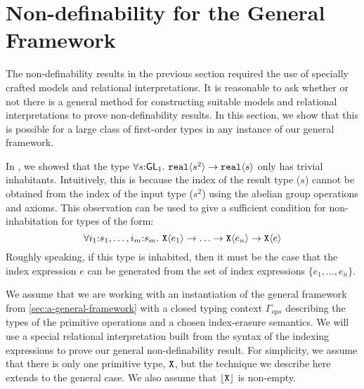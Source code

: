 \section{Non-definability for the General Framework}
\label{sec:general-nondef}

The non-definability results in the previous section required the use
of specially crafted models and relational interpretations. It is
reasonable to ask whether or not there is a general method for
constructing suitable models and relational interpretations to prove
non-definability results. In this section, we show that this is
possible for a large class of first-order types in any instance of our
general framework.

In , we showed that the type $\forall s
\mathord: \mathsf{GL}_1.~\textup{\texttt{real}}\langle s^2 \rangle \to \textup{\texttt{real}}\langle s \rangle$ only has
trivial inhabitants. Intuitively, this is because the index of the
result type ($s$) cannot be obtained from the index of the input type
($s^2$) using the abelian group operations and axioms. This
observation can be used to give a sufficient condition for
non-inhabitation for types of the form:
\begin{displaymath}
  \forall i_1\mathord:s_1,\ldots,i_m\mathord:s_m.~\textup{\texttt{X}}\langle e_1 \rangle \to \ldots \to \textup{\texttt{X}}\langle e_n \rangle \to \textup{\texttt{X}}\langle e \rangle
\end{displaymath}
Roughly speaking, if this type is inhabited, then it must be the case
that the index expression $e$ can be generated from the set of index
expressions $\{e_1,...,e_n\}$.

We assume that we are working with an instantiation of the general
framework from \autoref{sec:a-general-framework} with a closed typing
context $\Gamma_{\mathit{ops}}$ describing the types of the primitive
operations and a chosen index-erasure semantics. We will use a special
relational interpretation built from the syntax of the indexing
expressions to prove our general non-definability result. For
simplicity, we assume that there is only one primitive type,
$\textup{\texttt{X}}$, but the technique we describe here extends to the
general case. We also assume that $\left\lfloor \textup{\texttt{X}} \right\rfloor$ is non-empty.

